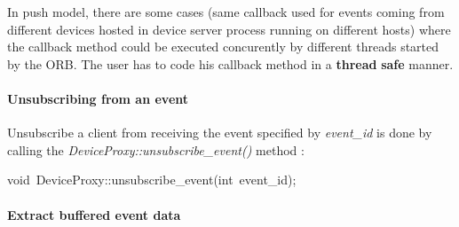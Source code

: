 In push model, there are some cases (same callback used for events
coming from different devices hosted in device server process running
on different hosts) where the callback method could be executed concurently
by different threads started by the ORB. The user has to code his
callback method in a \textbf{thread} \textbf{safe}
manner.


\paragraph{Unsubscribing from an event }

Unsubscribe a client from receiving the event specified by \emph{event\_id}
is done by calling the \emph{DeviceProxy::unsubscribe\_event()}
method :
\begin{lyxcode}
void~DeviceProxy::unsubscribe\_event(int~event\_id);


\end{lyxcode}

\paragraph{Extract buffered event data}

